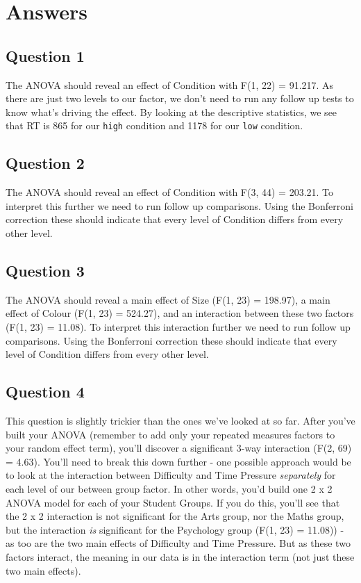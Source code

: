 \documentclass[
]{book}
\begin{document}
\hypertarget{answers}{%
\section{Answers}\label{answers}}

\hypertarget{question-1-1}{%
\subsection{Question 1}\label{question-1-1}}

The ANOVA should reveal an effect of Condition with F(1, 22) = 91.217. As there are just two levels to our factor, we don't need to run any follow up tests to know what's driving the effect. By looking at the descriptive statistics, we see that RT is 865 for our \texttt{high} condition and 1178 for our \texttt{low} condition.

\hypertarget{question-2-1}{%
\subsection{Question 2}\label{question-2-1}}

The ANOVA should reveal an effect of Condition with F(3, 44) = 203.21. To interpret this further we need to run follow up comparisons. Using the Bonferroni correction these should indicate that every level of Condition differs from every other level.

\hypertarget{question-3-1}{%
\subsection{Question 3}\label{question-3-1}}

The ANOVA should reveal a main effect of Size (F(1, 23) = 198.97), a main effect of Colour (F(1, 23) = 524.27), and an interaction between these two factors (F(1, 23) = 11.08). To interpret this interaction further we need to run follow up comparisons. Using the Bonferroni correction these should indicate that every level of Condition differs from every other level.

\hypertarget{question-4-1}{%
\subsection{Question 4}\label{question-4-1}}

This question is slightly trickier than the ones we've looked at so far. After you've built your ANOVA (remember to add only your repeated measures factors to your random effect term), you'll discover a significant 3-way interaction (F(2, 69) = 4.63). You'll need to break this down further - one possible approach would be to look at the interaction between Difficulty and Time Pressure \emph{separately} for each level of our between group factor. In other words, you'd build one 2 x 2 ANOVA model for each of your Student Groups. If you do this, you'll see that the 2 x 2 interaction is not significant for the Arts group, nor the Maths group, but the interaction \emph{is} significant for the Psychology group (F(1, 23) = 11.08)) - as too are the two main effects of Difficulty and Time Pressure. But as these two factors interact, the meaning in our data is in the interaction term (not just these two main effects).
\end{document}
